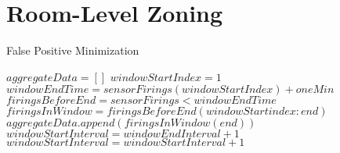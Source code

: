 \chapter{Room-Level Zoning}
\label{appendix:roomLevelZoningAlgs}

\begin{algorithm}                      %
\caption{False Positive Minimization}          %
\label{alg:fpFiltering}                           %
\begin{algorithmic}                    %
\STATE $aggregateData = []$
\STATE $windowStartIndex = 1$
\STATE $windowEndTime = sensorFirings(windowStartIndex) + oneMin$
\STATE $firingsBeforeEnd = sensorFirings < windowEndTime$
\STATE $firingsInWindow = firingsBeforeEnd(windowStartindex:end)$
\STATE $aggregateData.append(firingsInWindow(end))$
\STATE $windowStartInterval = windowEndInterval + 1$
\ELSE
\STATE $windowStartInterval = windowStartInterval + 1$
\ENDIF
\ENDWHILE
\end{algorithmic}
\end{algorithm}

